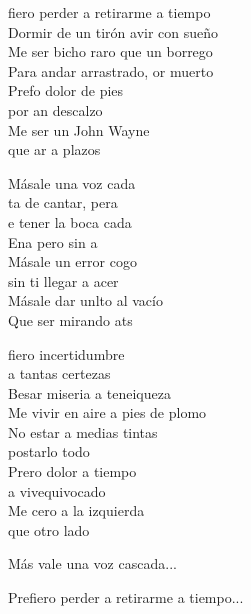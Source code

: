 \begin{cancion}%
	fiero perder a retirarme a tiempo\\
	Dormir de un tirón avir con sueño\\
	Me ser bicho raro que un borrego\\
	Para andar arrastrado, or muerto\\
	\jump
	Prefo dolor de pies\\
	por an descalzo\\
	Me ser un John Wayne \\
	que ar a plazos\jump\\
	\begin{chorus}%
		Másale una voz cada\\
		ta de cantar, pera\\
		e tener la boca cada\\
		Ena pero sin a\\
		Másale un error cogo\\
		 sin ti llegar a acer \\
		Másale dar unlto al vacío  \\
		Que ser mirando ats\jump\\
	\end{chorus}%
	fiero incertidumbre \\
	\jump
a tantas certezas\\
	Besar miseria a teneiqueza\\
	Me vivir en aire a pies de plomo\\
	\jump
No estar a medias tintas \\
	postarlo todo\\
	\jump
	Prero dolor a tiempo \\
	a vivequivocado\\
	Me cero a la izquierda \\
	que otro lado\jump\\
	\begin{chorus}%
	Más vale una voz cascada...\jump\\
	\end{chorus}%
Prefiero perder a retirarme a tiempo...\\
\end{cancion}%
